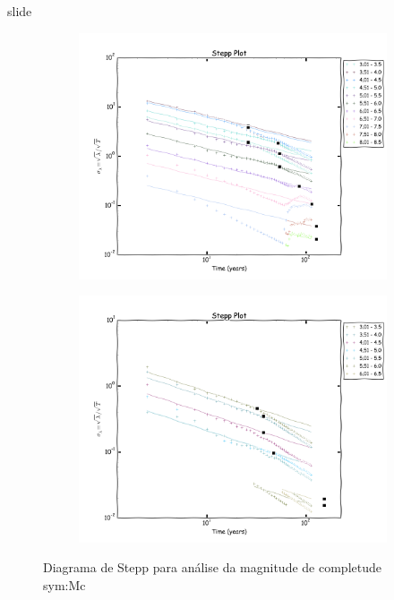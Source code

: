 \documentclass[ucs,8pt]{beamer}
\begin{document}
\begin{frame}{slide}

\begin{figure}[H]
	\centering
	\begin{subfigure}[b]{0.47\textheight}
		  	\centering
			\includegraphics[height=1.00\textheight]{stepp_sa}
			\label{fig:sa_stepp}
	\end{subfigure}%
	\quad %
	\begin{subfigure}[b]{0.47\textheight}
		  	\centering
			\includegraphics[height=1.00\textheight]{stepp_br}
			\label{fig:br_stepp}
    \end{subfigure}%
	\caption{Diagrama de Stepp para análise da magnitude de completude \gls{sym:Mc}}
	\label{fig:eq_stepp}
\end{figure}


\end{frame}
\end{document}
